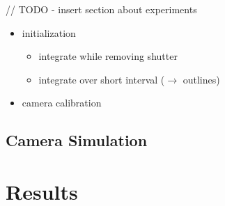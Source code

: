 \documentclass[10pt,twocolumn,letterpaper]{article}
\begin{document}
// TODO - insert section about experiments

\begin{itemize}
\item initialization
\begin{itemize}
\item integrate while removing shutter
\item integrate over short interval ($\rightarrow$ outlines)
\end{itemize}
\item camera calibration
\end{itemize}



\subsection{Camera Simulation}



\section{Results}




{\small


}
\end{document}
